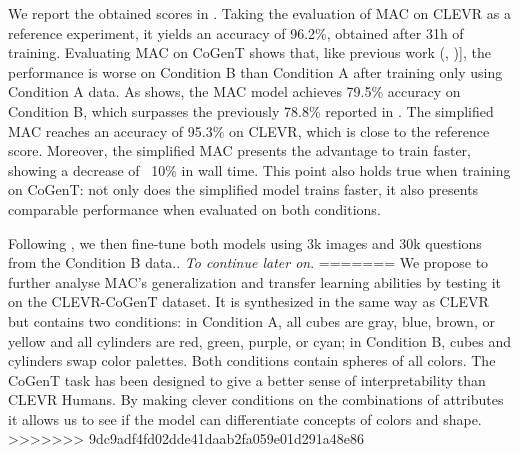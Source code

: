 We report the obtained scores in . Taking the evaluation of MAC on CLEVR as a reference experiment, it yields an accuracy of 96.2\%, obtained after 31h of training.
Evaluating MAC on CoGenT shows that, like previous work (\cite{johnson2017inferring}, \cite{mascharka2018transparency})], the performance is worse on Condition B than Condition A after training only using Condition A data. As  shows, the MAC model achieves 79.5\% accuracy on Condition B, which surpasses the previously 78.8\% reported in \cite{perez2017film}. 
The simplified MAC reaches an accuracy of 95.3\% on CLEVR, which is close to the reference score. Moreover, the simplified MAC presents the advantage to train faster, showing a decrease of ~10\% in wall time. This point also holds true when training on CoGenT: not only does the simplified model trains faster, it also presents comparable performance when evaluated on both conditions.


Following \cite{johnson2017inferring}, we then fine-tune both models using 3k images and 30k questions from the Condition B data.. \textit{To continue later on}.
=======
We propose to further analyse MAC’s generalization and transfer learning abilities by testing it on the CLEVR-CoGenT dataset. It is synthesized in the same way as CLEVR but contains two conditions: in Condition A, all cubes are gray, blue, brown, or yellow and all cylinders are red, green, purple, or cyan; in Condition B, cubes and cylinders swap color palettes. Both conditions contain spheres of all colors. The CoGenT task has been designed to give a better sense of interpretability than CLEVR Humans. By making clever conditions on the combinations of attributes it allows us to see  if the model can differentiate concepts of colors and shape.
>>>>>>> 9dc9adf4fd02dde41daab2fa059e01d291a48e86
